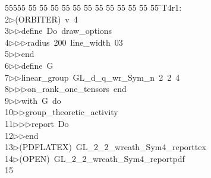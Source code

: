 %
%
\begin{tabbing}
55555 \= 55 \= 55 \= 55 \= 55 \= 55 \= 55 \= 55 \= 55 \= 55 \= 55 \= 55 \= 55 \= \>T4r1:\\[0pt]
2\>$\triangleright$\>(ORBITER)\ v\ 4\ \\[0pt]
3\>$\triangleright$\>$\triangleright$\>define\ Do\ draw\_options\ \\[0pt]
4\>$\triangleright$\>$\triangleright$\>$\triangleright$\>radius\ 200\ line\_width\ 03\ \\[0pt]
5\>$\triangleright$\>$\triangleright$\>end\ \\[0pt]
6\>$\triangleright$\>$\triangleright$\>define\ G\ \\[0pt]
7\>$\triangleright$\>$\triangleright$\>linear\_group\ GL\_d\_q\_wr\_Sym\_n\ 2\ 2\ 4\ \\[0pt]
8\>$\triangleright$\>$\triangleright$\>$\triangleright$\>on\_rank\_one\_tensors\ end\ \\[0pt]
9\>$\triangleright$\>$\triangleright$\>with\ G\ do\ \\[0pt]
10\>$\triangleright$\>$\triangleright$\>group\_theoretic\_activity\ \\[0pt]
11\>$\triangleright$\>$\triangleright$\>$\triangleright$\>report\ Do\ \\[0pt]
12\>$\triangleright$\>$\triangleright$\>end\\[0pt]
13\>$\triangleright$\>(PDFLATEX)\ GL\_2\_2\_wreath\_Sym4\_reporttex\\[0pt]
14\>$\triangleright$\>(OPEN)\ GL\_2\_2\_wreath\_Sym4\_reportpdf\\[0pt]
15\>\end{tabbing}
